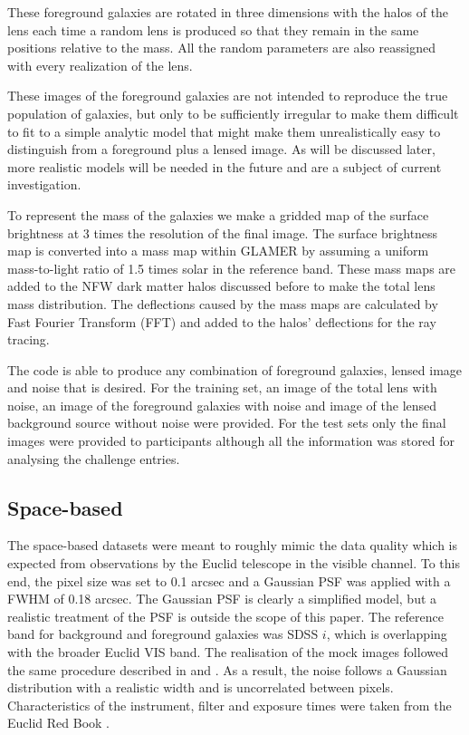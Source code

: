 \documentclass{aa}
\begin{document}
These foreground galaxies are rotated in three dimensions with the halos of the lens each time a random lens is produced so that they remain in the same positions relative to the mass.  All the random parameters are also reassigned with every realization of the lens.

These images of the foreground galaxies are not intended to reproduce the true population of galaxies, but only to be sufficiently irregular to make them difficult to fit to a simple analytic model that might make them unrealistically easy to distinguish from a foreground plus a lensed image.   As will be discussed later, more realistic models will be needed in the future and are a subject of current investigation.

To represent the mass of the galaxies we make a gridded map of the surface brightness at 3 times the resolution of the final image.  The surface brightness map is converted into a mass map within GLAMER by assuming a uniform mass-to-light ratio of 1.5 times solar in the reference band.  These mass maps are added to the NFW dark matter halos discussed before to make the total lens mass distribution.  The deflections caused by the mass maps are calculated by Fast Fourier Transform (FFT) and added to the halos'  deflections for the ray tracing. 

The code is able to produce any combination of foreground galaxies, lensed image and noise that is desired.  For the training set,  an image of the total lens with noise, an image of the foreground galaxies with noise and image of the lensed background source without noise were provided.
For the test sets only the final images were provided to participants although all the information was stored for analysing the challenge entries.

\subsection{Space-based}
\label{sec:sim-space-based}

The space-based datasets were meant to roughly mimic the data quality which is expected from observations by the Euclid telescope in the visible channel. To this end, the pixel size was set to 0.1 arcsec and a Gaussian PSF was applied with a FWHM of 0.18 arcsec. The Gaussian PSF is clearly a simplified model, but a realistic treatment of the PSF is outside the scope of this paper. The reference band for background and foreground galaxies was SDSS $i$, which is overlapping with the broader Euclid VIS band. The realisation of the mock images followed the same procedure described in \citet{2004PASP..116..750G} and \citet{2008AandA...482..403M}. As a result, the noise follows a Gaussian distribution with a realistic width and is uncorrelated between pixels. Characteristics of the instrument, filter and exposure times were taken from the Euclid Red Book \citep{2011arXiv1110.3193L}.
 
\end{document}
